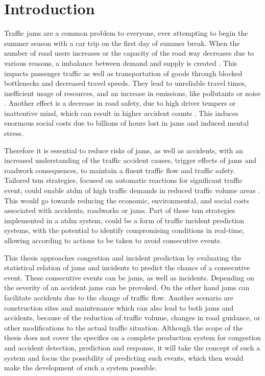 \chapter{Introduction}
\setcounter{page}{1}
Traffic jams are a common problem to everyone, ever attempting to begin the summer season with a car trip on the first day of summer break. When the number of road users increases or the capacity of the road way decreases due to various reasons, a imbalance between demand and supply is created \parencite{Tang2019}. This impacts passenger traffic as well as transportation of goods through blocked bottlenecks and decreased travel speeds. They lead to unreliable travel times, inefficient usage of resources, and an increase in emissions, like pollutants or noise \parencite{FHA2011}. Another effect is a decrease in road safety, due to high driver tempers or inattentive mind, which can result in higher accident counts \parencite{Sun2016}. This induces enormous social costs due to billions of hours lost in jams and induced mental stress. \parencite{RetallackOstendorf2019,BardtFritsch2014,ADAC2019}

Therefore it is essential to reduce risks of jams, as well as accidents, with an increased understanding of the traffic accident causes, trigger effects of jams and roadwork consequences, to maintain a fluent traffic flow and traffic safety. Tailored \acrfull{tsm} strategies, focused on automatic reactions for significant traffic event, could enable \acrfull{atdm} of high traffic demands in reduced traffic volume areas \parencite{Tang2019}. This would go towards reducing the economic, environmental, and social costs associated with accidents, roadworks or jams. Part of these \acrshort{tsm} strategies implemented in a \acrshort{atdm} system, could be a form of traffic incident prediction systems, with the potential to identify compromising conditions in real-time, allowing according to actions to be taken to avoid consecutive events. \parencite{RetallackOstendorf2019} 

\bigskip

This thesis approaches congestion and incident prediction by evaluating the statistical relation of jams and incidents to predict the chance of a consecutive event. These consecutive events can be jams, as well as incidents. Depending on the severity of an accident jams can be provoked. On the other hand jams can facilitate accidents due to the change of traffic flow. Another scenario are construction sites and maintenance which can also lead to both jams and accidents, because of the reduction of traffic volume, changes in road guidance, or other modifications to the actual traffic situation. Although the scope of the thesis does not cover the specifics on a complete production system for congestion and accident detection, prediction and response, it will take the concept of such a system and focus the possibility of predicting such events, which then would make the development of such a system possible. 

